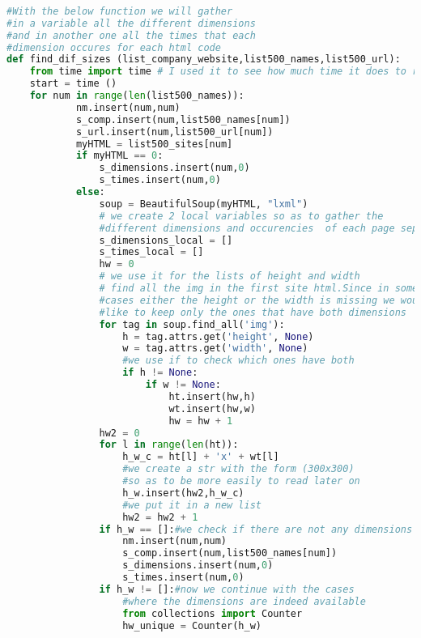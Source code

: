 \documentclass{article}
\begin{document}
\begin{lstlisting}[language=Python]
 
#With the below function we will gather 
#in a variable all the different dimensions 
#and in another one all the times that each 
#dimension occures for each html code
def find_dif_sizes (list_company_website,list500_names,list500_url):
    from time import time # I used it to see how much time it does to run the function
    start = time ()
    for num in range(len(list500_names)):
            nm.insert(num,num)                  
            s_comp.insert(num,list500_names[num])
            s_url.insert(num,list500_url[num])
            myHTML = list500_sites[num] 
            if myHTML == 0:
                s_dimensions.insert(num,0)
                s_times.insert(num,0)    
            else: 
                soup = BeautifulSoup(myHTML, "lxml")
                # we create 2 local variables so as to gather the 
                #different dimensions and occurencies  of each page seperately
                s_dimensions_local = []
                s_times_local = []
                hw = 0 
                # we use it for the lists of height and width
                # find all the img in the first site html.Since in some 
                #cases either the height or the width is missing we would 
                #like to keep only the ones that have both dimensions
                for tag in soup.find_all('img'):
                    h = tag.attrs.get('height', None)
                    w = tag.attrs.get('width', None)
                    #we use if to check which ones have both 
                    if h != None:
                        if w != None:
                            ht.insert(hw,h)
                            wt.insert(hw,w)
                            hw = hw + 1                        
                hw2 = 0
                for l in range(len(ht)):
                    h_w_c = ht[l] + 'x' + wt[l]    
                    #we create a str with the form (300x300) 
                    #so as to be more easily to read later on 
                    h_w.insert(hw2,h_w_c)  
                    #we put it in a new list
                    hw2 = hw2 + 1    
                if h_w == []:#we check if there are not any dimensions available
                    nm.insert(num,num)                  
                    s_comp.insert(num,list500_names[num])
                    s_dimensions.insert(num,0)
                    s_times.insert(num,0)    
                if h_w != []:#now we continue with the cases 
                    #where the dimensions are indeed available             
                    from collections import Counter
                    hw_unique = Counter(h_w)

\end{lstlisting}
\end{document}
